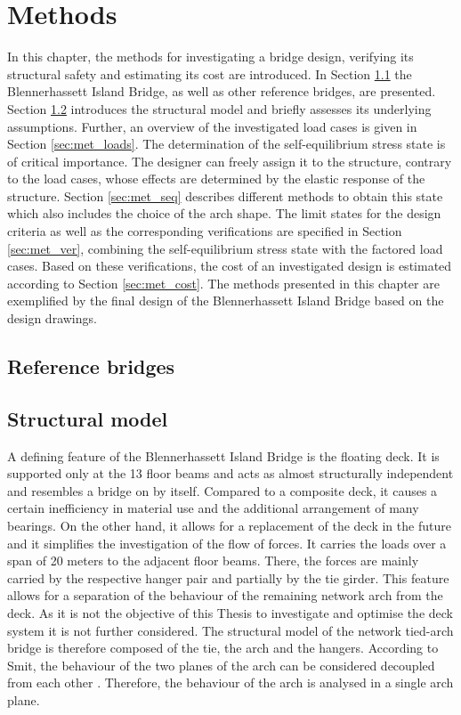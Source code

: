 \chapter{Methods}\label{sec:methods}
In this chapter, the methods for investigating a bridge design, verifying its structural safety and estimating its cost are introduced. In Section \ref{sec:met_ref} the Blennerhassett Island Bridge, as well as other reference bridges, are presented.
Section \ref{sec:met_str} introduces the structural model and briefly assesses its underlying assumptions. Further, an overview of the investigated load cases is given in Section \ref{sec:met_loads}. The determination of the self-equilibrium stress state is of critical importance. The designer can freely assign it to the structure, contrary to the load cases, whose effects are determined by the elastic response of the structure. Section \ref{sec:met_seq} describes different methods to obtain this state which also includes the choice of the arch shape. The limit states for the design criteria as well as the corresponding verifications are specified in Section \ref{sec:met_ver}, combining the self-equilibrium stress state with the factored load cases. Based on these verifications, the cost of an investigated design is estimated according to Section \ref{sec:met_cost}. The methods presented in this chapter are exemplified by the final design of the Blennerhassett Island Bridge based on the design drawings.

\section{Reference bridges} \label{sec:met_ref}

\newpage
\section{Structural model} \label{sec:met_str}
A defining feature of the Blennerhassett Island Bridge is the floating deck. It is supported only at the 13 floor beams and acts as almost structurally independent and resembles a bridge on by itself. Compared to a composite deck, it causes a certain inefficiency in material use and the additional arrangement of many bearings. On the other hand, it allows for a replacement of the deck in the future and it simplifies the investigation of the flow of forces. It carries the loads over a span of 20 meters to the adjacent floor beams. There, the forces are mainly carried by the respective hanger pair and partially by the tie girder. This feature allows for a separation of the behaviour of the remaining network arch from the deck. As it is not the objective of this Thesis to investigate and optimise the deck system it is not further considered. The structural model of the network tied-arch bridge is therefore composed of the tie, the arch and the hangers. According to Smit, the behaviour of the two planes of the arch can be considered decoupled from each other \cite{Smit}. Therefore, the behaviour of the arch is analysed in a single arch plane.\medskip

